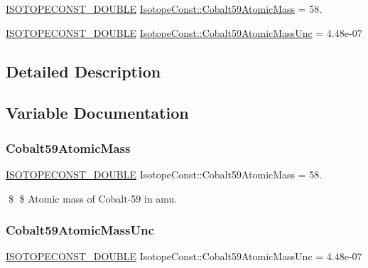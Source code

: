 \begin{DoxyCompactItemize}
\item 
\mbox{\hyperlink{group___isotope_const-_macros_ga8f45a7272ce02c0b4c65c44636ed719a}{I\+S\+O\+T\+O\+P\+E\+C\+O\+N\+S\+T\+\_\+\+D\+O\+U\+B\+LE}} \mbox{\hyperlink{group___isotope_const-_cobalt-_co59_gaeadc29893259ad59aac466abe0c3cacf}{Isotope\+Const\+::\+Cobalt59\+Atomic\+Mass}} = 58.
\item 
\mbox{\hyperlink{group___isotope_const-_macros_ga8f45a7272ce02c0b4c65c44636ed719a}{I\+S\+O\+T\+O\+P\+E\+C\+O\+N\+S\+T\+\_\+\+D\+O\+U\+B\+LE}} \mbox{\hyperlink{group___isotope_const-_cobalt-_co59_ga7b2a8d5ca1aea9396a8371944b2ec8d0}{Isotope\+Const\+::\+Cobalt59\+Atomic\+Mass\+Unc}} = 4.\+48e-\/07
\end{DoxyCompactItemize}


\subsection{Detailed Description}


\subsection{Variable Documentation}
\mbox{\label{group___isotope_const-_cobalt-_co59_gaeadc29893259ad59aac466abe0c3cacf}} 
\subsubsection{\texorpdfstring{Cobalt59\+Atomic\+Mass}{Cobalt59AtomicMass}}
{\footnotesize\ttfamily \mbox{\hyperlink{group___isotope_const-_macros_ga8f45a7272ce02c0b4c65c44636ed719a}{I\+S\+O\+T\+O\+P\+E\+C\+O\+N\+S\+T\+\_\+\+D\+O\+U\+B\+LE}} Isotope\+Const\+::\+Cobalt59\+Atomic\+Mass = 58.}

\$ \$ Atomic mass of Cobalt-\/59 in amu. \mbox{\label{group___isotope_const-_cobalt-_co59_ga7b2a8d5ca1aea9396a8371944b2ec8d0}} 
\subsubsection{\texorpdfstring{Cobalt59\+Atomic\+Mass\+Unc}{Cobalt59AtomicMassUnc}}
{\footnotesize\ttfamily \mbox{\hyperlink{group___isotope_const-_macros_ga8f45a7272ce02c0b4c65c44636ed719a}{I\+S\+O\+T\+O\+P\+E\+C\+O\+N\+S\+T\+\_\+\+D\+O\+U\+B\+LE}} Isotope\+Const\+::\+Cobalt59\+Atomic\+Mass\+Unc = 4.\+48e-\/07}

